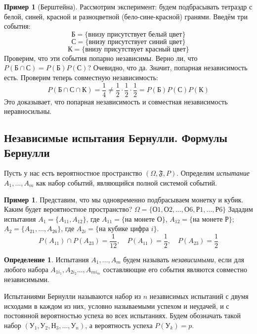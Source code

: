 \documentclass[11pt,openany,a4paper]{scrartcl}
\theoremstyle{plain}
\theoremstyle{definition}
\newtheorem{definition}[theorem]{Определение}
\newtheorem{example}[theorem]{Пример}
\begin{document}
\begin{example}[Берштейна]
    Рассмотрим эксперимент: будем подбрасывать тетраэдр с белой, синей, красной и 
    разноцветной (бело-сине-красной) гранями. Введём три события:
    $$Б = \{\text{внизу присутствует белый цвет}\}$$
    $$С = \{\text{внизу присутствует синий цвет}\}$$
    $$К = \{\text{внизу присутствует красный цвет}\}$$
    Проверим, что эти события попарно независимы. Верно ли, что
    $P(Б \cap С) = P(Б)P(С)$? Очевидно, что да. Значит, попарная независимость есть.
    Проверим теперь совместную независимость:
    $$
    P(Б\cap С\cap К) = \frac{1}{4} \neq \frac{1}{2} \cdot\frac{1}{2} \cdot\frac{1}{2} =
    P(Б)P(С)P(К)
    $$
    Это доказывает, что попарная независимость и совместная независимость 
    неравносильны.
\end{example}

\subsection{Независимые испытания Бернулли. Формулы Бернулли}

Пусть у нас есть вероятностное пространство $(\Omega, \mathfrak{F}, P)$.
Определим \emph{испытание}
$A_1, \ldots, A_m$ как 
набор событий, являющийся полной системой событий.

\begin{example}
    Представим, что мы одновременно подбрасываем монетку и кубик. Каким будет 
    вероятностное пространство? $\Omega = \{О1, О2, \ldots, О6, Р1, \ldots, Р6\}$
    Зададим испытания $A_1 = \{A_{11}, A_{12}\}$, где
    $A_{11} = \{\text{на монете О}\}$,
    $A_{12} = \{\text{на монете Р}\}$;
    $A_2 = \{A_{21},\ldots,A_{26}\}$, где $A_{2i}=\{\text{на кубике цифра } i\}$.
    $$
    P(A_{11})\cap P(A_{23}) = \frac{1}{12},\quad P(A_{11})=\frac{1}{2},\quad
    P(A_{23})=\frac{1}{2}
    $$
\end{example}

\begin{definition}
    Испытания $A_1, \ldots, A_m$ будем называть \emph{независимыми}, если для любого
    набора $A_{1i_1}, A_{2i_2} \ldots, A_{mi_m}$ составляющие его события являются
    совместно независимыми.
\end{definition}

Испытаниями Бернулли называются набор из $n$ независимых испытаний с двумя
исходами в каждом из 
них, условно называемыми успехом и неудачей, и с постоянной вероятностью успеха во всех 
испытаниях. Будем обозначать такой набор $(У_1, У_2, Н_3, \ldots, У_n)$, а вероятность
успеха $P(У_k)=p$.
\end{document}
